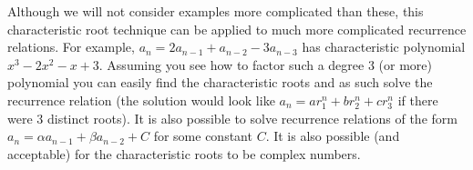 \documentclass[11pt,]{book}
\theoremstyle{ptxplainnotitle}
\theoremstyle{ptxplaintitle}
\theoremstyle{ptxdefinitionnotitle}
\theoremstyle{ptxdefinitiontitle}
\theoremstyle{ptxdefinitionnotitle}
\theoremstyle{ptxdefinitiontitle}
\theoremstyle{ptxdefinitionnotitle}
\theoremstyle{ptxdefinitiontitle}
\theoremstyle{ptxdefinitiontitlenonumber}
\theoremstyle{ptxdefinitiontitlenonumber}
\numberwithin{equation}{chapter}
\begin{document}
\hypertarget{p-471}{}%
Although we will not consider examples more complicated than these, this characteristic root technique can be applied to much more complicated recurrence relations. For example, \(a_n = 2a_{n-1} + a_{n-2} - 3a_{n-3}\) has characteristic polynomial \(x^3 - 2 x^2 - x + 3\). Assuming you see how to factor such a degree 3 (or more) polynomial you can easily find the characteristic roots and as such solve the recurrence relation (the solution would look like \(a_n = ar_1^n + br_2^n + cr_3^n\) if there were 3 distinct roots). It is also possible to solve recurrence relations of the form \(a_n = \alpha a_{n-1} + \beta a_{n-2} + C\) for some constant \(C\). It is also possible (and acceptable) for the characteristic roots to be complex numbers.%
\typeout{************************************************}
\typeout{************************************************}
\end{document}
